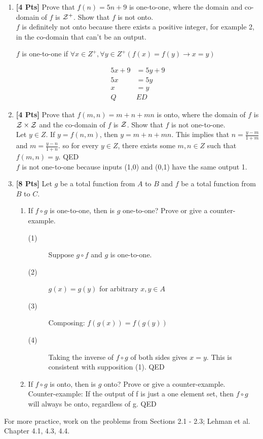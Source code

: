 \documentclass[12pt]{article}
\begin{document}
\begin{enumerate}
        \item {\bf [4 Pts]} Prove that $f(n) = 5n + 9$ is one-to-one, where the domain and co-domain of $f$ is $\cal Z^+$. Show that $f$ is not onto. \\
            $f$ is definitely not onto because there exists a positive integer, for example 2, in the co-domain that can't be an output.
            \begin{center} $f$ is one-to-one if $\forall x \in Z^+ ,\forall y \in Z^+ (f(x) = f(y) \to x = y)$ \end{center}
                \begin{align*}
                    5x+9 &= 5y+9 \\
                    5x &= 5y \\
                    x &= y \\
                    Q&ED
                \end{align*}
        \item {\bf [4 Pts]} Prove that $f(m,n) = m + n + mn$ is onto, where the domain of $f$ is ${\cal Z} \times {\cal Z}$ and the co-domain of $f$ is $\cal Z$. Show that $f$ is not one-to-one. \\
            Let $y \in Z$. If $y = f(n, m)$, then $y = m + n + mn$. This implies that $n = \frac{y-m}{1+m}$ and $m = \frac{y-n}{1+n}$. so for every $y \in Z$, there exists some $m, n \in Z$ such that $f(m, n) = y$. QED \\
            $f$ is not one-to-one because inputs (1,0) and (0,1) have the same output 1.

        \item {\bf [8 Pts]} Let $g$ be a total function from $A$ to $B$ and $f$ be a total function from
        $B$ to $C$.

        \begin{enumerate}
            \item If $f \circ g$ is one-to-one, then is $g$ one-to-one?
            Prove or give a counter-example.
            \begin{description}
                \item[(1)] Suppose $g \circ f$ and $g$ is one-to-one.
                \item[(2)] $g(x) = g(y)$ for arbitrary $x, y \in A$
                \item[(3)] Composing: $f(g(x)) = f(g(y))$
                \item[(4)] Taking the inverse of $f \circ g$ of both sides gives $x = y$. This is consistent with supposition (1). QED
            \end{description}
            \item If $f \circ g$ is onto, then is $g$ onto?
            Prove or give a counter-example. \\
            Counter-example: If the output of f is just a one element set, then $f \circ g$ will always be onto, regardless of g. QED

        \end{enumerate}

    \end{enumerate}

    \noindent
    For more practice, work on the problems from Sections 2.1 - 2.3; Lehman et al. Chapter 4.1, 4.3, 4.4.
\end{document}

